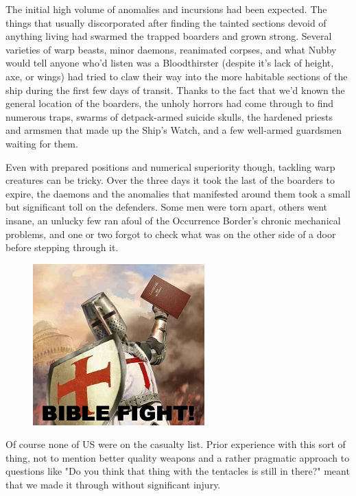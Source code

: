 The initial high volume of anomalies and incursions had been expected. 
The things that usually discorporated after finding the tainted sections devoid of anything living had swarmed the trapped boarders and grown strong. 
Several varieties of warp beasts, minor daemons, reanimated corpses, and what Nubby would tell anyone who'd listen was a Bloodthirster (despite it's lack of height, axe, or wings) had tried to claw their way into the more habitable sections of the ship during the first few days of transit. 
Thanks to the fact that we'd known the general location of the boarders, the unholy horrors had come through to find numerous traps, swarms of detpack-armed suicide skulls, the hardened priests and armsmen that made up the Ship's Watch, and a few well-armed guardsmen waiting for them.

Even with prepared positions and numerical superiority though, tackling warp creatures can be tricky. 
Over the three days it took the last of the boarders to expire, the daemons and the anomalies that manifested around them took a small but significant toll on the defenders. 
Some men were torn apart, others went insane, an unlucky few ran afoul of the Occurrence Border's chronic mechanical problems, and one or two forgot to check what was on the other side of a door before stepping through it.

\begin{figure}
	\begin{center}
		\includegraphics[width=\figwidth]{pics/15/11.png}
	\end{center}
\end{figure}
Of course none of US were on the casualty list. 
Prior experience with this sort of thing, not to mention better quality weapons and a rather pragmatic approach to questions like "Do you think that thing with the tentacles is still in there?" meant that we made it through without significant injury. 


